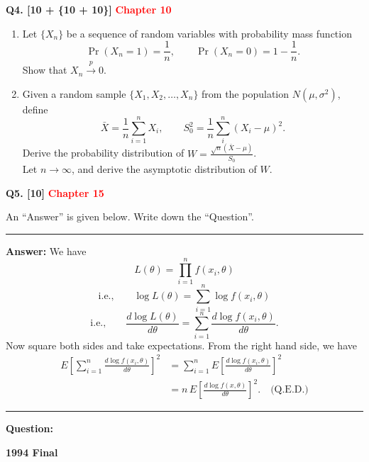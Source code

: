 \documentclass[11pt]{article}
\begin{document}
\bigskip
\textbf{Q4. [10 + \{10 + 10\}]}  \textbf{\textcolor{red}{Chapter 10}}

\begin{enumerate}
\setlength{\itemsep}{8pt}\setlength{\parsep}{0pt}\setlength{\topsep}{3pt}
\item[(i)] Let $\{X_n\}$ be a sequence of random variables with probability mass function
\[
\Pr(X_n=1)=\frac{1}{n},\qquad\Pr(X_n=0)=1-\frac{1}{n}.
\]
Show that $X_n\xrightarrow{p}0$.
\item[(ii)] Given a random sample $\{X_1,X_2,\ldots,X_n\}$ from the population $N(\mu,\sigma^2)$, define
\[
\bar X=\frac{1}{n}\sum_{i=1}^n X_i,\qquad
S_0^2=\frac{1}{n}\sum_i^n(X_i-\mu)^2.
\]
Derive the probability distribution of $W=\frac{\sqrt n(\bar X-\mu)}{S_0}$.\\
Let $n\to\infty$, and derive the asymptotic distribution of $W$.
\end{enumerate}

\bigskip
\textbf{Q5. [10]}  \textbf{\textcolor{red}{Chapter 15}}

An ``Answer'' is given below. Write down the ``Question''.

\medskip
\hrule
\medskip

\textbf{Answer:} We have
\[
L(\theta)=\prod_{i=1}^n f(x_i,\theta)
\]
\[
\text{i.e.,}\qquad \log L(\theta)=\sum_{i=1}^n \log f(x_i,\theta)
\]
\[
\text{i.e.,}\qquad \frac{d\log L(\theta)}{d\theta}
=\sum_{i=1}^n \frac{d\log f(x_i,\theta)}{d\theta}.
\]
Now square both sides and take expectations. From the right hand side, we have
\[
\begin{aligned}
E\left[\sum_{i=1}^n\frac{d\log f(x_i,\theta)}{d\theta}\right]^2
&=\sum_{i=1}^n E\left[\frac{d\log f(x_i,\theta)}{d\theta}\right]^2\\
&=n\,E\left[\frac{d\log f(x,\theta)}{d\theta}\right]^2.\quad\text{(Q.E.D.)}
\end{aligned}
\]

\medskip
\hrule
\medskip
\textbf{Question:}


\clearpage

\begin{center}
    {\Large\bfseries 1994 Final}
\end{center}
\end{document}
